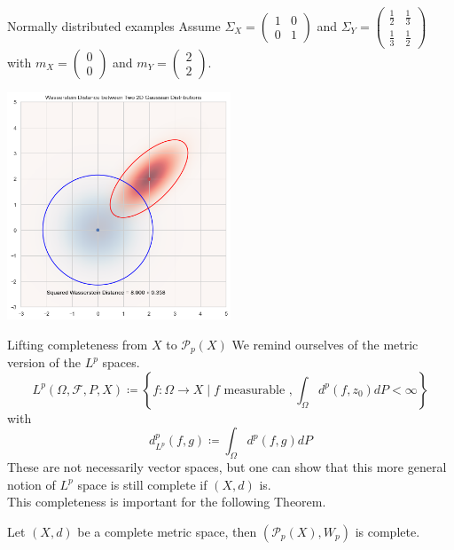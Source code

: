 \documentclass[10pt]{beamer}
\theoremstyle{reminder}
\begin{document}
\begin{frame}{Normally distributed examples}
    Assume $\Sigma_X = \begin{pmatrix}1 & 0 \\ 0 & 1\end{pmatrix}$ and $\Sigma_Y = \begin{pmatrix}\frac{1}{2} & \frac{1}{3} \\ \frac{1}{3} & \frac{1}{2} \end{pmatrix}$ 
with $m_X = \begin{pmatrix}0 \\ 0 \end{pmatrix}$ and $m_Y = \begin{pmatrix}2 \\ 2 \end{pmatrix}$. 
\begin{center}
    \includegraphics[width=0.5\textwidth]{images/Wasserstein.png}  
\end{center}
\end{frame}


\begin{frame}{Lifting completeness from $X$ to $\mathcal{P}_p(X)$}
    We remind ourselves of the metric version of the $L^p$ spaces. 
        $$L^p(\Omega,\mathcal{F}, P, X) \coloneqq \left\{ f : \Omega \rightarrow X \mid f \text{ measurable }, \int_\Omega d^p(f,z_0) d P < \infty \right\}$$ with$$d_{L^p}^p(f,g) \coloneqq \int_\Omega d^p(f,g) dP$$
        These are not necessarily vector spaces, but one can show that this more general notion of $L^p$ space is still complete if $(X,d)$ is. \\
        This completeness is important for the following Theorem.
    \begin{theorem}
        Let $(X,d)$ be a complete metric space, then $(\mathcal{P}_p(X), W_p)$ is complete.
    \end{theorem}
\end{frame}
\end{document}

